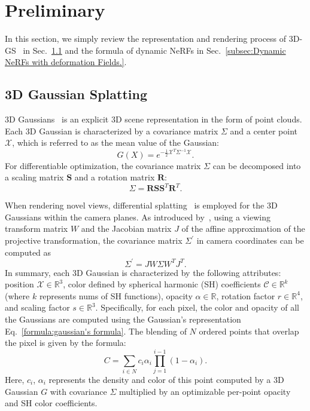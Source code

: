 \section{Preliminary}
In this section, we simply review the representation and rendering process of 3D-GS~\cite{3dgs} in Sec.~\ref{subsec:3D Gaussian Splatting} and the formula of dynamic NeRFs in Sec.~\ref{subsec:Dynamic NeRFs with deformation Fields.}.

\subsection{3D Gaussian Splatting}
\label{subsec:3D Gaussian Splatting}
3D Gaussians~\cite{3dgs} is an explicit 3D scene representation in the form of point clouds. Each 3D Gaussian is characterized by a covariance matrix $\Sigma$ and a center point $\mathcal{X}$, which is referred to as the mean value of the Gaussian:
\begin{equation}
\label{formula:gaussian's formula}
    G(X)=e^{-\frac{1}{2}\mathcal{X}^T\Sigma^{-1}\mathcal{X}}.
\end{equation}
For differentiable optimization, the covariance matrix $\Sigma$ can be decomposed into a scaling matrix $\mathbf{S}$ and a rotation matrix $\mathbf{R}$:
\begin{equation}
\label{formula:covariance decomposition}
    \Sigma = \mathbf{R}\mathbf{S}\mathbf{S}^T\mathbf{R}^T.
\end{equation}

When rendering novel views, differential splatting~\cite{yifan2019differentiablesplatting} is employed for the 3D Gaussians within the camera planes. As introduced by~\cite{zwicker2001surfacesplatting}, using a viewing transform matrix $W$ and the Jacobian matrix $J$ of the affine approximation of the projective transformation, the covariance matrix $\Sigma^{\prime}$ in camera coordinates can be computed as
\begin{equation}
    \Sigma^{\prime} = JW\Sigma W^TJ^T.
\end{equation}
In summary, each 3D Gaussian is characterized by the following attributes: position $\mathcal{X} \in \mathbb{R}^3$, color defined by spherical harmonic (SH) coefficients $\mathcal{C} \in \mathbb{R}^k$ (where $k$ represents nums of SH functions), opacity $\alpha \in \mathbb{R}$, rotation factor $r \in \mathbb{R}^4$, and scaling factor $s \in \mathbb{R}^3$.
Specifically, for each pixel, the color and opacity of all the Gaussians are computed using the Gaussian's representation Eq.~\ref{formula:gaussian's formula}. The blending of $N$ ordered points that overlap the pixel is given by the formula:
\begin{equation}
\label{formula: splatting&volume rendering}
    C = \sum_{i\in N}c_i \alpha_i \prod_{j=1}^{i-1} (1-\alpha_i).
\end{equation}
Here, $c_i$, $\alpha_i$ represents the density and color of this point computed by a 3D Gaussian $G$ with covariance $\Sigma$ multiplied by an optimizable per-point opacity and SH color coefficients.


